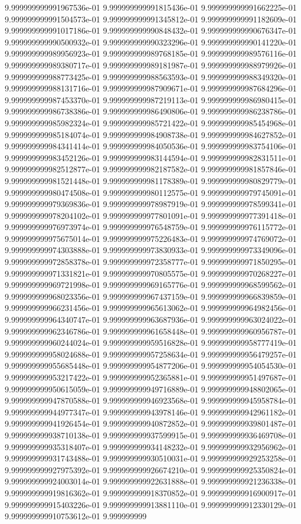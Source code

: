 9.999999999991967536e-01	9.999999999991815436e-01	9.999999999991662225e-01	9.999999999991504573e-01	9.999999999991345812e-01	9.999999999991182609e-01	9.999999999991017186e-01	9.999999999990848432e-01	9.999999999990676347e-01	9.999999999990500932e-01	9.999999999990323296e-01	9.999999999990141220e-01	9.999999999989956923e-01	9.999999999989768185e-01	9.999999999989576116e-01	9.999999999989380717e-01	9.999999999989181987e-01	9.999999999988979926e-01	9.999999999988773425e-01	9.999999999988563593e-01	9.999999999988349320e-01	9.999999999988131716e-01	9.999999999987909671e-01	9.999999999987684296e-01	9.999999999987453370e-01	9.999999999987219113e-01	9.999999999986980415e-01	9.999999999986738386e-01	9.999999999986490806e-01	9.999999999986238786e-01	9.999999999985982324e-01	9.999999999985721422e-01	9.999999999985454968e-01	9.999999999985184074e-01	9.999999999984908738e-01	9.999999999984627852e-01	9.999999999984341414e-01	9.999999999984050536e-01	9.999999999983754106e-01	9.999999999983452126e-01	9.999999999983144594e-01	9.999999999982831511e-01	9.999999999982512877e-01	9.999999999982187582e-01	9.999999999981857846e-01	9.999999999981521448e-01	9.999999999981178389e-01	9.999999999980829779e-01	9.999999999980474508e-01	9.999999999980112575e-01	9.999999999979745091e-01	9.999999999979369836e-01	9.999999999978987919e-01	9.999999999978599341e-01	9.999999999978204102e-01	9.999999999977801091e-01	9.999999999977391418e-01	9.999999999976973974e-01	9.999999999976548759e-01	9.999999999976115772e-01	9.999999999975675014e-01	9.999999999975226483e-01	9.999999999974769072e-01	9.999999999974303888e-01	9.999999999973830933e-01	9.999999999973349096e-01	9.999999999972858378e-01	9.999999999972358777e-01	9.999999999971850295e-01	9.999999999971331821e-01	9.999999999970805575e-01	9.999999999970268227e-01	9.999999999969721998e-01	9.999999999969165776e-01	9.999999999968599562e-01	9.999999999968023356e-01	9.999999999967437159e-01	9.999999999966839859e-01	9.999999999966231456e-01	9.999999999965613062e-01	9.999999999964982456e-01	9.999999999964340747e-01	9.999999999963687936e-01	9.999999999963024022e-01	9.999999999962346786e-01	9.999999999961658448e-01	9.999999999960956787e-01	9.999999999960244024e-01	9.999999999959516828e-01	9.999999999958777419e-01	9.999999999958024688e-01	9.999999999957258634e-01	9.999999999956479257e-01	9.999999999955685448e-01	9.999999999954877206e-01	9.999999999954054530e-01	9.999999999953217422e-01	9.999999999952365881e-01	9.999999999951497687e-01	9.999999999950615059e-01	9.999999999949716889e-01	9.999999999948802065e-01	9.999999999947870588e-01	9.999999999946923568e-01	9.999999999945958784e-01	9.999999999944977347e-01	9.999999999943978146e-01	9.999999999942961182e-01	9.999999999941926454e-01	9.999999999940872852e-01	9.999999999939801487e-01	9.999999999938710138e-01	9.999999999937599915e-01	9.999999999936469708e-01	9.999999999935318407e-01	9.999999999934148232e-01	9.999999999932956962e-01	9.999999999931743488e-01	9.999999999930510031e-01	9.999999999929253258e-01	9.999999999927975392e-01	9.999999999926674210e-01	9.999999999925350824e-01	9.999999999924003014e-01	9.999999999922631888e-01	9.999999999921236338e-01	9.999999999919816362e-01	9.999999999918370852e-01	9.999999999916900917e-01	9.999999999915403226e-01	9.999999999913881110e-01	9.999999999912330129e-01	9.999999999910753612e-01	9.999999999